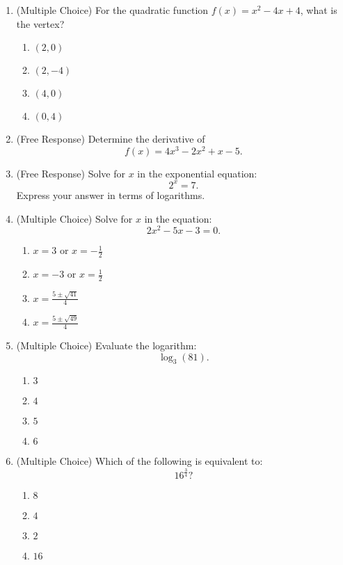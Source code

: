 \documentclass[12pt]{article}
\begin{document}
\begin{enumerate}[label=\textbf{Question \arabic*:}]
  \item (Multiple Choice) For the quadratic function \(f(x) = x^2 - 4x + 4\), what is the vertex?
    \begin{enumerate}[label=(\Alph*)]
      \item \((2, 0)\)
      \item \((2, -4)\)
      \item \((4, 0)\)
      \item \((0, 4)\)
    \end{enumerate}
    
  \item (Free Response) Determine the derivative of 
    \[
    f(x) = 4x^3 - 2x^2 + x - 5.
    \]
    
  \item (Free Response) Solve for \(x\) in the exponential equation:
    \[
    2^x = 7.
    \]
    Express your answer in terms of logarithms.

    \item (Multiple Choice) Solve for \(x\) in the equation:
    \[
    2x^2 - 5x - 3 = 0.
    \]
    \begin{enumerate}[label=(\Alph*)]
      \item \(x = 3\) or \(x = -\frac{1}{2}\)
      \item \(x = -3\) or \(x = \frac{1}{2}\)
      \item \(x = \frac{5 \pm \sqrt{41}}{4}\)
      \item \(x = \frac{5 \pm \sqrt{49}}{4}\)
    \end{enumerate}
    
  \item (Multiple Choice) Evaluate the logarithm:
    \[
    \log_3(81).
    \]
    \begin{enumerate}[label=(\Alph*)]
      \item \(3\)
      \item \(4\)
      \item \(5\)
      \item \(6\)
    \end{enumerate}
    
  \item (Multiple Choice) Which of the following is equivalent to:
    \[
    16^{\frac{3}{4}}?
    \]
    \begin{enumerate}[label=(\Alph*)]
      \item \(8\)
      \item \(4\)
      \item \(2\)
      \item \(16\)
    \end{enumerate}
    

\end{enumerate}
\end{document}
